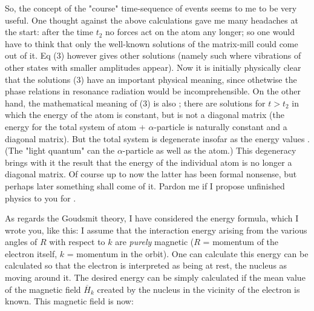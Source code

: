 So, the concept of the "course" time-sequence of events seems to me to be very useful. One thought against the above calculations gave me many headaches at the start: after the time $t_2$ no forces act on the atom any longer; so one would have to think that only the well-known solutions of the matrix-mill could come out of it. Eq (3) however gives other solutions (namely such where vibrations of other states with smaller amplitudes appear). Now it is initially physically clear that the solutions (3) have an important physical meaning, since othetwise the phase relations in resonance radiation would be incomprehensible. On the other hand, the mathematical meaning of (3) is also ; there are solutions for $t>t_2$ in which the energy of the atom is constant, but is not a diagonal matrix (the energy for the total system of atom + $\alpha$-particle is naturally constant and a diagonal matrix). But the total system is degenerate insofar as the energy values . (The "light quantum" can  the $\alpha$-particle as well as the atom.) This degeneracy brings with it the result that the energy of the individual atom is no longer a diagonal matrix. Of course up to now the latter has been formal nonsense, but perhaps later something shall come of it. Pardon me if I propose unfinished physics to you for .

As regards the Goudsmit theory, I have considered the energy formula, which I wrote you, like this: I assume that the interaction energy arising from the various angles of $R$ with respect to $k$ are \textit{purely} magnetic ($R$ = momentum of the electron itself, $k$ = momentum in the orbit). One can calculate this energy can be calculated so that the electron is interpreted as being at rest, the nucleus as moving around it. The desired energy can be simply calculated if the mean value of the magnetic field $\overline{H}_k$ created by the nucleus in the vicinity of the electron is known. This magnetic field is now:


